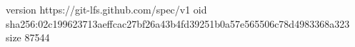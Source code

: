 version https://git-lfs.github.com/spec/v1
oid sha256:02c199623713aeffcac27bf26a43b4fd39251b0a57e565506c78d4983368a323
size 87544
